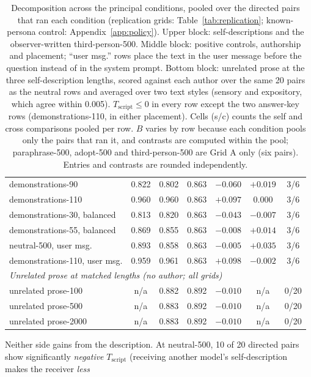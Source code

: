 \documentclass[11pt]{article}
\newcommand{\B}{B}
\newcommand{\Tscript}{T_{\mathrm{script}}}
\begin{document}
\begin{table}[!t]
\begin{tabular}{lcccccc}
demonstrations-90 & 0.822 & 0.802 & 0.863 & $-0.060$ & $+0.019$ & 3/6 \\
demonstrations-110 & 0.960 & 0.960 & 0.863 & $\mathbf{+0.097}$ & $0.000$ & 3/6 \\
demonstrations-30, balanced & 0.813 & 0.820 & 0.863 & $-0.043$ & $-0.007$ & 3/6 \\
demonstrations-55, balanced & 0.869 & 0.855 & 0.863 & $-0.008$ & $+0.014$ & 3/6 \\
neutral-500, user msg. & 0.893 & 0.858 & 0.863 & $-0.005$ & $+0.035$ & 3/6 \\
demonstrations-110, user msg. & 0.959 & 0.961 & 0.863 & $\mathbf{+0.098}$ & $-0.002$ & 3/6 \\
\midrule
\multicolumn{7}{l}{\emph{Unrelated prose at matched lengths (no author; all grids)}} \\
unrelated prose-100  & n/a & 0.882 & 0.892 & $-0.010$ & n/a & 0/20 \\
unrelated prose-500  & n/a & 0.883 & 0.892 & $-0.010$ & n/a & 0/20 \\
unrelated prose-2000 & n/a & 0.883 & 0.892 & $-0.010$ & n/a & 0/20 \\
\bottomrule
\end{tabular}
\caption{Decomposition across the principal conditions, pooled over the
directed pairs that ran each condition (replication grids:
Table~\ref{tab:replication}; known-persona control:
Appendix~\ref{app:policy}). Upper block: self-descriptions and the
observer-written third-person-500. Middle block: positive controls,
authorship and placement; ``user msg.'' rows place the text in the user
message before the question instead of in the system prompt. Bottom block:
unrelated prose at the three self-description lengths, scored against each
author over the same 20 pairs as the neutral rows and averaged over two text
styles (sensory and expository, which agree within 0.005). $\Tscript \le 0$
in every row except the two answer-key rows (demonstrations-110, in either
placement). Cells (s/c) counts the self and cross comparisons pooled per
row. $\B$ varies by row because each condition pools only the pairs that ran
it, and contrasts are computed within the pool; paraphrase-500, adopt-500
and third-person-500 are Grid A only (six pairs). Entries and contrasts are
rounded independently.}
\label{tab:decomp}
\end{table}
 Neither side gains from the description. At neutral-500,
10 of 20 directed pairs show significantly \emph{negative} $\Tscript$
(receiving another model's self-description makes the receiver \emph{less}
\end{document}
